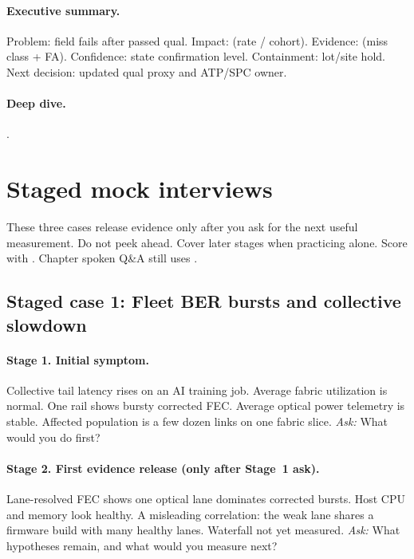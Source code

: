 \paragraph{Executive summary.}
Problem: field fails after passed qual. Impact: (rate / cohort). Evidence:
(miss class + FA). Confidence: state confirmation level. Containment: lot/site
hold. Next decision: updated qual proxy and ATP/SPC owner.

\paragraph{Deep dive.}
.

\section{Staged mock interviews}
\label{sec:case-staged-mocks}

These three cases release evidence only after you ask for the next useful
measurement. Do not peek ahead. Cover later stages when practicing alone.
Score with . Chapter spoken Q\&A still uses
.

\subsection{Staged case 1: Fleet BER bursts and collective slowdown}
\label{sec:case-staged-fleet-ber}

\paragraph{Stage 1. Initial symptom.}
Collective tail latency rises on an AI training job. Average fabric utilization
is normal. One rail shows bursty corrected FEC. Average optical power telemetry
is stable. Affected population is a few dozen links on one fabric slice.
\textit{Ask:} What would you do first?

\paragraph{Stage 2. First evidence release (only after Stage~1 ask).}
Lane-resolved FEC shows one optical lane dominates corrected bursts. Host
CPU and memory look healthy. A misleading correlation: the weak lane shares a
firmware build with many healthy lanes. Waterfall not yet measured.
\textit{Ask:} What hypotheses remain, and what would you measure next?

